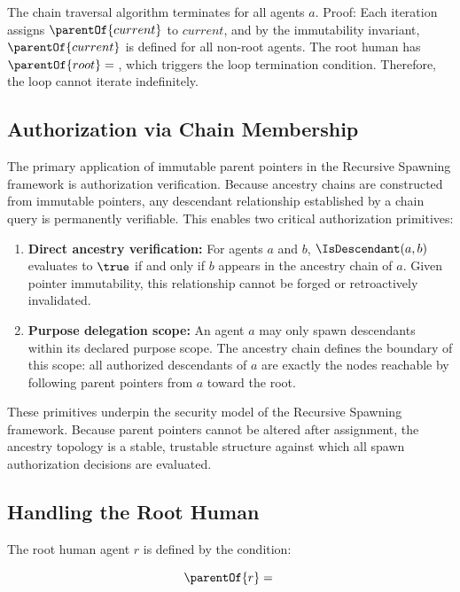 \begin{invariant}
The chain traversal algorithm terminates for all agents $a$. Proof: Each iteration assigns $\parentOf{current}$ to $current$, and by the immutability invariant, $\parentOf{current}$ is defined for all non-root agents. The root human has $\parentOf{root} = \null$, which triggers the loop termination condition. Therefore, the loop cannot iterate indefinitely.
\end{invariant}

\subsection{Authorization via Chain Membership}

The primary application of immutable parent pointers in the Recursive Spawning framework is authorization verification. Because ancestry chains are constructed from immutable pointers, any descendant relationship established by a chain query is permanently verifiable. This enables two critical authorization primitives:

\begin{enumerate}
    \item \textbf{Direct ancestry verification:} For agents $a$ and $b$, $\IsDescendant(a, b)$ evaluates to $\true$ if and only if $b$ appears in the ancestry chain of $a$. Given pointer immutability, this relationship cannot be forged or retroactively invalidated.
    \item \textbf{Purpose delegation scope:} An agent $a$ may only spawn descendants within its declared purpose scope. The ancestry chain defines the boundary of this scope: all authorized descendants of $a$ are exactly the nodes reachable by following parent pointers from $a$ toward the root.
\end{enumerate}

These primitives underpin the security model of the Recursive Spawning framework. Because parent pointers cannot be altered after assignment, the ancestry topology is a stable, trustable structure against which all spawn authorization decisions are evaluated.

\subsection{Handling the Root Human}

The root human agent $r$ is defined by the condition:

\begin{equation}
    \parentOf{r} = \null
\end{equation}


